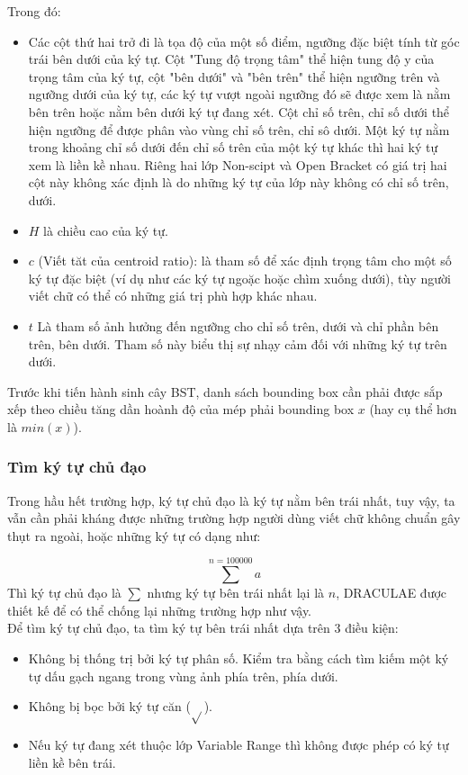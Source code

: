 \documentclass[a4paper]{article}
\theoremstyle{definition}
\begin{document}
	Trong đó:
	\begin{itemize}
		\item Các cột thứ hai trở đi là tọa độ của một số điểm, ngưỡng đặc biệt tính từ góc trái bên dưới của ký tự. Cột "Tung độ trọng tâm" thể hiện tung độ y của trọng tâm của ký tự, cột "bên dưới" và "bên trên" thể hiện ngưỡng trên và ngưỡng dưới của ký tự, các ký tự vượt ngoài ngưỡng đó sẽ được xem là nằm bên trên hoặc nằm bên dưới ký tự đang xét. Cột chỉ số trên, chỉ số dưới thể hiện ngưỡng để được phân vào vùng chỉ số trên, chỉ sô dưới. Một ký tự nằm trong khoảng chỉ số dưới đến chỉ số trên của một ký tự khác thì hai ký tự xem là liền kề nhau. Riêng hai lớp Non-scipt và Open Bracket có giá trị hai cột này không xác định là do những ký tự của lớp này không có chỉ số trên, dưới.
		\item $H$ là chiều cao của ký tự.
		\item $c$ (Viết tăt của centroid ratio): là tham số để xác định trọng tâm cho một số ký tự đặc biệt (ví dụ như các ký tự ngoặc hoặc chìm xuống dưới), tùy người viết chữ có thể có những giá trị phù hợp khác nhau.
		\item $t$ Là tham số ảnh hưởng đến ngưỡng cho chỉ số trên, dưới và chỉ phần bên trên, bên dưới. Tham số này biểu thị sự nhạy cảm đối với những ký tự trên dưới.
	\end{itemize}
	
	
	Trước khi tiến hành sinh cây BST, danh sách bounding box cần phải được sắp xếp theo chiều tăng dần hoành độ của mép phải bounding box $x$ (hay cụ thể hơn là $min(x)$). \\
	
	\subsubsection*{Tìm ký tự chủ đạo\cite{zanibbi}}
	
	Trong hầu hết trường hợp, ký tự chủ đạo\cite{zanibbi} là ký tự nằm bên trái nhất, tuy vậy, ta vẫn cần phải kháng được những trường hợp người dùng viết chữ không chuẩn gây thụt ra ngoài, hoặc những ký tự có dạng như:
	
	$$ \sum^{n = 100000} a $$
	Thì ký tự chủ đạo\cite{zanibbi} là $\sum$ nhưng ký tự bên trái nhất lại là $n$, DRACULAE\cite{zanibbi} được thiết kế để có thể chống lại những trường hợp như vậy.\\
	
	Để tìm ký tự chủ đạo\cite{zanibbi}, ta tìm ký tự bên trái nhất dựa trên 3 điều kiện:
	
	\begin{itemize}
		\item Không bị thống trị bởi ký tự phân số. Kiểm tra bằng cách tìm kiếm một ký tự dấu gạch ngang trong vùng ảnh phía trên, phía dưới.
		\item Không bị bọc bởi ký tự căn ($\sqrt{}$).
		\item Nếu ký tự đang xét thuộc lớp Variable Range thì không được phép có ký tự liền kề bên trái.
	\end{itemize}
	
\end{document}
